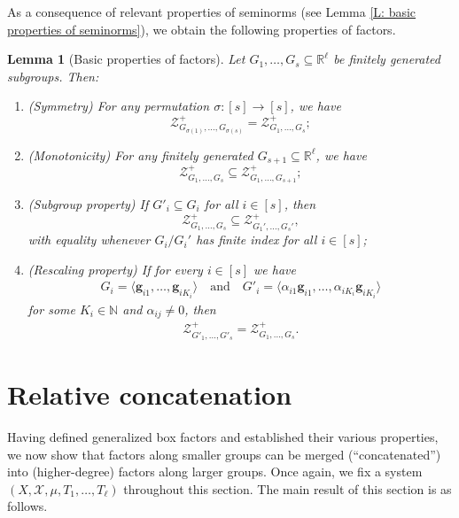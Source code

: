 \documentclass[11pt]{amsart}
\newtheorem{lemma}{Lemma}[section]
\theoremstyle{definition}
\newcommand{\N}{{\mathbb N}}
\newcommand{\R}{{\mathbb R}}
\newcommand{\CX}{{\mathcal X}}
\newcommand{\CZ}{{\mathcal Z}}
\newcommand{\bg}{{\mathbf{g}}}
\newcommand{\1}{{\mathbf{1}}}
\begin{document}
As a consequence of relevant properties of seminorms (see Lemma \ref{L: basic properties of seminorms}), we obtain the following properties of factors.
\begin{lemma}[Basic properties of factors]\label{L: basic properties of factors}
   Let $G_1, \ldots, G_s\subseteq\R^\ell$ be finitely generated subgroups. Then: 
     \begin{enumerate}
        \item (Symmetry) For any permutation $\sigma:[s]\to[s]$, we have $$\CZ_{G_{\sigma(1)}, \ldots, G_{\sigma(s)}}^+ = \CZ_{G_1, \ldots, G_s}^+;$$
        \item (Monotonicity) For any finitely generated $G_{s+1}\subseteq\R^\ell$, we have $$\CZ_{G_1, \ldots, G_s}^+\subseteq\CZ_{G_1, \ldots, G_{s+1}}^+;$$
        \item (Subgroup property) If $G'_i\subseteq G_i$ for all $i\in[s]$, then $$\CZ_{G_1, \ldots, G_s}^+\subseteq \CZ_{G_1', \ldots, G_s'}^+,$$ with equality whenever $G_i/G_i'$ has finite index for all $i\in[s]$;
        \item (Rescaling property) If for every $i\in[s]$ we have
        \begin{align*}
            G_i = \langle \bg_{i1}, \ldots, \bg_{iK_i}\rangle\quad \textrm{and}\quad G'_i = \langle \alpha_{i1}\bg_{i1}, \ldots, \alpha_{iK_i} \bg_{iK_i}\rangle 
        \end{align*}
        for some $K_i\in\N$ and $\alpha_{ij}\neq 0$, then
    \begin{align*}
       \CZ^+_{G'_1, \ldots, G'_s}=\CZ^+_{G_1, \ldots, G_s}.
    \end{align*}
    \end{enumerate}
\end{lemma}

\section{Relative concatenation}\label{S: concatenation}

Having defined generalized box factors and established their various properties, we now show that factors along smaller groups can be merged (``concatenated'') into (higher-degree) factors along larger groups. Once again, we fix a system $(X, \CX, \mu, T_1, \ldots, T_\ell)$ throughout this section. The main result of this section is as follows.
\end{document}
